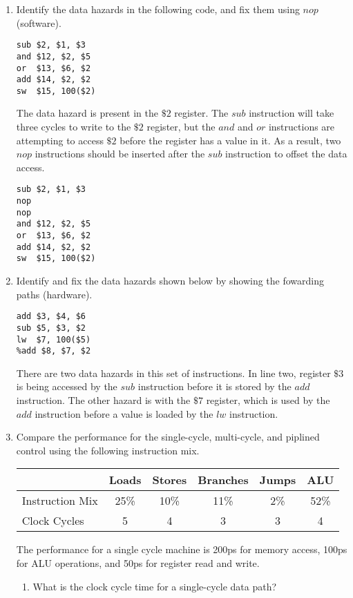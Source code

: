 \documentclass{article}
\begin{document}
\begin{enumerate}
\item Identify the data hazards in the following code, and fix them using $nop$ (software).
\begin{center}
\begin{verbatim}
sub $2, $1, $3
and $12, $2, $5
or  $13, $6, $2
add $14, $2, $2
sw  $15, 100($2)
\end{verbatim}
\end{center}
\indent The data hazard is present in the $\$2$ register.
The $sub$ instruction will take three cycles to write to the $\$2$ register, but the $and$ and $or$ instructions are attempting to access $\$2$ before the register has a value in it.
As a result, two $nop$ instructions should be inserted after the $sub$ instruction to offset the data access.
\begin{verbatim}
sub $2, $1, $3
nop
nop
and $12, $2, $5
or  $13, $6, $2
add $14, $2, $2
sw  $15, 100($2)
\end{verbatim}
\item Identify and fix the data hazards shown below by showing the fowarding paths (hardware).
\begin{verbatim}
add $3, $4, $6
sub $5, $3, $2
lw  $7, 100($5)
%add $8, $7, $2
\end{verbatim}
There are two data hazards in this set of instructions.
In line two, register $\$3$ is being accessed by the $sub$ instruction before it is stored by the $add$ instruction.
The other hazard is with the $\$7$ register, which is used by the $add$ instruction before a value is loaded by the $lw$ instruction.
\item Compare the performance for the single-cycle, multi-cycle, and piplined control using the following instruction mix.
\begin{center}
\begin{tabular}{|l|c|c|c|c|c|}
\hline
& Loads & Stores & Branches & Jumps & ALU\\
\hline
Instruction Mix & 25\% & 10\% & 11\% & 2\% & 52\%\\
\hline
Clock Cycles & 5 & 4 & 3 & 3 & 4\\
\hline
\end{tabular}
\end{center}
The performance for a single cycle machine is 200ps for memory access, 100ps for ALU operations, and 50ps for register read and write.
\begin{enumerate}
\item What is the clock cycle time for a single-cycle data path?

\end{enumerate}
\end{enumerate}
\end{document}
